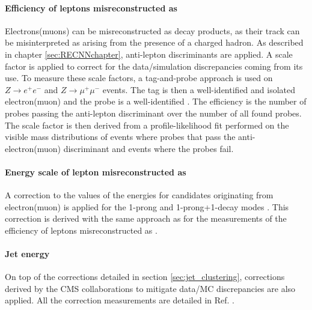 \paragraph{Efficiency of leptons misreconstructed as \tauh} Electrons(muons) can be misreconstructed as \tauh decay products, as their track can be misinterpreted as arising from the presence of a charged hadron. As described in chapter \ref{sec:RECNNchapter}, anti-lepton discriminants are applied. A scale factor is applied to correct for the data/simulation discrepancies coming from its use. To measure these scale factors, a tag-and-probe approach is used on $Z\rightarrow e^{+}e^{-}$ and $Z\rightarrow \mu^{+}\mu^{-}$ events. The tag is then a well-identified and isolated electron(muon) and the probe is a well-identified \tauh. The efficiency is the number of \tauh probes passing the anti-lepton discriminant over the number of all found \tauh probes. The scale factor is then derived from a profile-likelihood fit performed on the visible mass distributions of events where probes that pass the anti-electron(muon) discriminant and events where the probes fail.


\paragraph{Energy scale of lepton misreconstructed as \tauh} A correction to the values of the \tauh energies for \tauh candidates originating from electron(muon) is applied for the 1-prong and 1-prong+1-\pizero decay modes \cite{Chatrchyan2011}. This correction is derived with the same approach as for the measurements of the efficiency of leptons misreconstructed as \tauh.

\paragraph{Jet energy} On top of the corrections detailed in section \ref{sec:jet_clustering}, corrections derived by the CMS collaborations to mitigate data/MC discrepancies are also applied. All the correction measurements are detailed in Ref. \cite{collaboration_2011}.


